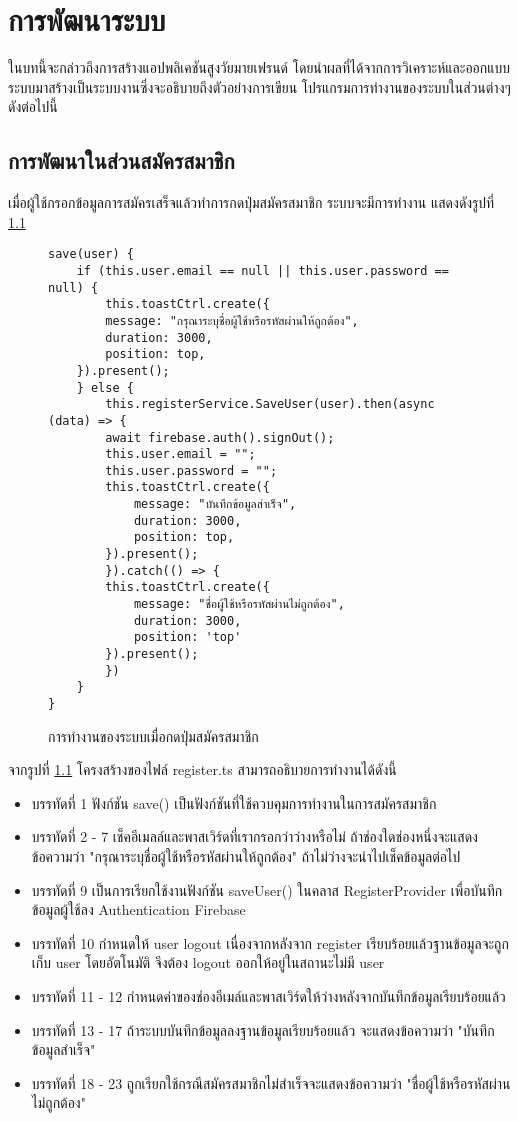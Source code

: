 \chapter{การพัฒนาระบบ}
ในบทนี้จะกล่าวถึงการสร้างแอปพลิเคชันสูงวัยมายเฟรนด์ โดยนำผลที่ได้จากการวิเคราะห์และออกแบบระบบมาสร้างเป็นระบบงานซึ่งจะอธิบายถึงตัวอย่างการเขียน โปรแกรมการทำงานของระบบในส่วนต่างๆดังต่อไปนี้

\section{การพัฒนาในส่วนสมัครสมาชิก}
เมื่อผู้ใช้กรอกข้อมูลการสมัครเสร็จแล้วทำการกดปุ่มสมัครสมาชิก ระบบจะมีการทำงาน แสดงดังรูปที่ \ref{Fig:4-Register}
\begin{figure}[H]
{\lstset{language=Pascal}
\begin{lstlisting}
save(user) {
	if (this.user.email == null || this.user.password == null) {
		this.toastCtrl.create({
		message: "กรุณาระบุชื่อผู้ใช้หรือรหัสผ่านให้ถูกต้อง",
		duration: 3000,
		position: top,
	}).present();
	} else {
		this.registerService.SaveUser(user).then(async (data) => {
		await firebase.auth().signOut();
		this.user.email = "";
		this.user.password = "";
		this.toastCtrl.create({
			message: "บันทึกข้อมูลสำเร็จ",
			duration: 3000,
			position: top,
		}).present();
		}).catch(() => {
		this.toastCtrl.create({
			message: "ชื่อผู้ใช้หรือรหัสผ่านไม่ถูกต้อง",
			duration: 3000,
			position: 'top'
		}).present();
		})
	}
}
\end{lstlisting}}
\caption{การทำงานของระบบเมื่อกดปุ่มสมัครสมาชิก}
\label{Fig:4-Register}
\end{figure}
\newpage
จากรูปที่ \ref{Fig:4-Register} โครงสร้างของไฟล์ register.ts สามารถอธิบายการทำงานได้ดังนี้
\begin{itemize}[label={--}]
\item บรรทัดที่ 1 ฟังก์ชัน save() เป็นฟังก์ชันที่ใช้ควบคุมการทำงานในการสมัครสมาชิก
\item บรรทัดที่ 2 - 7 เช็คอีเมลล์และพาสเวิร์ดที่เรากรอกว่าว่างหรือไม่ ถ้าช่องใดช่องหนึ่งจะแสดงข้อความว่า "กรุณาระบุชื่อผู้ใช้หรือรหัสผ่านให้ถูกต้อง" ถ้าไม่ว่างจะนำไปเช็คข้อมูลต่อไป
\item บรรทัดที่ 9 เป็นการเรียกใช้งานฟังก์ชัน saveUser() ในคลาส RegisterProvider เพื่อบันทึกข้อมูลผู้ใช้ลง Authentication Firebase 
\item บรรทัดที่ 10 กำหนดให้ user logout เนื่องจากหลังจาก register เรียบร้อยแล้วฐานข้อมูลจะถูกเก็บ user โดยอัตโนมัติ จึงต้อง logout ออกให้อยู่ในสถานะไม่มี user
\item บรรทัดที่ 11 - 12 กำหนดค่าของช่องอีเมล์และพาสเวิร์ดให้ว่างหลังจากบันทึกข้อมูลเรียบร้อยแล้ว
\item บรรทัดที่ 13 - 17 ถ้าระบบบันทึกข้อมูลลงฐานข้อมูลเรียบร้อยแล้ว จะแสดงข้อความว่า "บันทึกข้อมูลสำเร็จ"
\item บรรทัดที่ 18 - 23 ถูกเรียกใช้กรณีสมัครสมาชิกไม่สำเร็จจะแสดงข้อความว่า "ชื่อผู้ใช้หรือรหัสผ่านไม่ถูกต้อง"
\end{itemize}
\newpage

